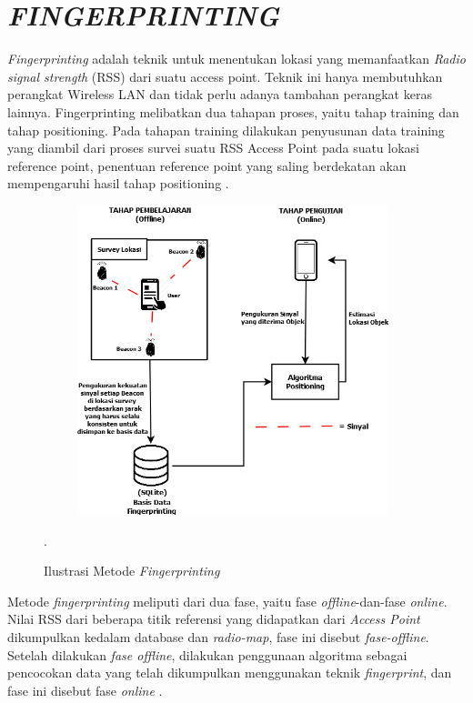 
\section{\uppercase{\textit{FINGERPRINTING}}}

\textit{Fingerprinting} adalah teknik untuk menentukan lokasi
yang memanfaatkan \textit{Radio signal strength} (RSS) dari suatu access point. Teknik ini hanya membutuhkan perangkat Wireless LAN dan tidak perlu adanya tambahan perangkat keras lainnya. Fingerprinting melibatkan dua tahapan proses, yaitu tahap training dan tahap positioning. Pada tahapan training dilakukan penyusunan data training yang diambil dari proses survei suatu RSS Access Point
pada suatu lokasi reference point, penentuan reference
point yang saling berdekatan akan mempengaruhi hasil
tahap positioning \citep{Gansemer2010}.

\fancyhf{}
\fancyfoot[R]{\thepage}

\begin{figure}[H]
	\centering
	\shadowbox
	{\includegraphics [width = 11cm, height= 9cm]{gambar/fingerprinting}}
	\caption{Ilustrasi Metode \textit{Fingerprinting} }.
	\label{fingerprinting}
\end{figure}

\par Metode \textit{fingerprinting} meliputi dari dua fase, yaitu fase \textit{offline}-dan-fase \textit{online}. Nilai RSS dari beberapa titik referensi yang didapatkan dari \textit{Access Point} dikumpulkan kedalam database dan \textit{radio-map}, fase ini disebut \textit{fase-offline}. Setelah dilakukan \textit{fase offline}, dilakukan penggunaan algoritma sebagai pencocokan data yang telah dikumpulkan menggunakan teknik \textit{fingerprint}, dan fase ini disebut fase \textit{online} \citep{Subhan2011}.

